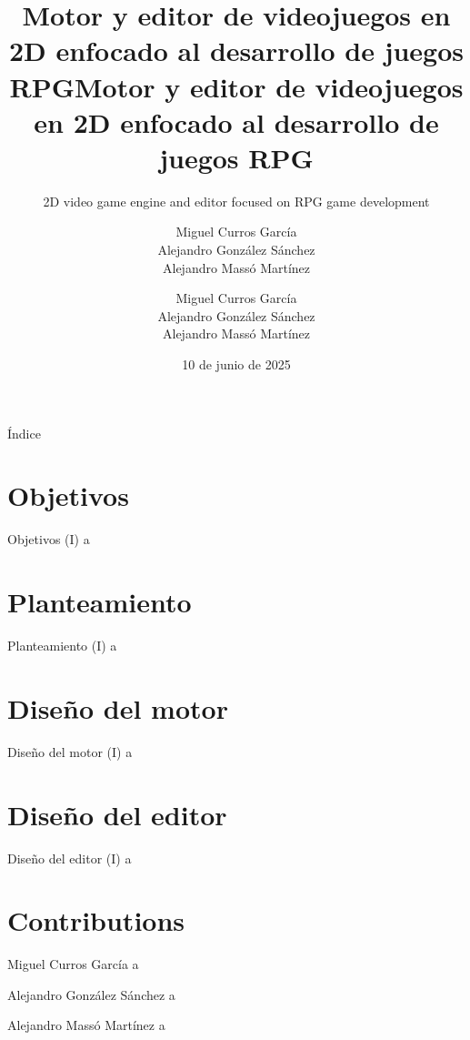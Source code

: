 \documentclass{beamer}
\title[Motor y editor de videojuegos en 2D enfocado al desarrollo de juegos RPG]{Motor y editor de videojuegos en 2D enfocado al desarrollo de juegos RPG}
\subtitle{2D video game engine and editor focused on RPG game development}
\author[Miguel Curros, Alejandro González y Alejandro Massó]{Miguel Curros García\\ Alejandro González Sánchez\\ Alejandro Massó Martínez}
\date{10 de junio de 2025}
\begin{document}
\frame{\titlepage}

\begin{frame}{Índice}
	\tableofcontents
\end{frame}

\section{Objetivos}
\begin{frame}{Objetivos (I)}
a
\end{frame}

\section{Planteamiento}
\begin{frame}{Planteamiento (I)}
a
\end{frame}
\section{Diseño del motor}
\begin{frame}{Diseño del motor (I)}
a
\end{frame}

\section{Diseño del editor}
\begin{frame}{Diseño del editor (I)}
a
\end{frame}

\title[2D video game engine and editor focused on RPG game development]{Motor y editor de videojuegos en 2D enfocado al desarrollo de juegos RPG}
\author[Miguel Curros, Alejandro González and Alejandro Massó]{Miguel Curros García\\ Alejandro González Sánchez\\ Alejandro Massó Martínez}

\section{Contributions}
\begin{frame}{Miguel Curros García}
a
\end{frame}

\begin{frame}{Alejandro González Sánchez}
a
\end{frame}

\begin{frame}{Alejandro Massó Martínez}
a
\end{frame}
\end{document}
